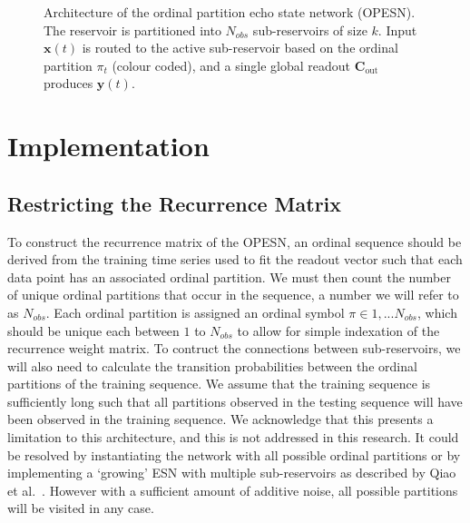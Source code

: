 \begin{figure}
    \caption{Architecture of the ordinal partition echo state network (OPESN). The reservoir is partitioned into $N_{obs}$ sub-reservoirs of size $k$. Input $\mathbf{x}(t)$ is routed to the active sub-reservoir based on the ordinal partition $\pi_t$ (colour coded), and a single global readout $\mathbf{C}_{\text{out}}$ produces $\mathbf{y}(t)$.}
    \label{fig:OPESN}
\end{figure}

\section{Implementation}

\subsection{Restricting the Recurrence Matrix}

To construct the recurrence matrix of the OPESN, an ordinal sequence should be derived from the training time series used to fit the readout vector such that each data point has an associated ordinal partition. We must then count the number of unique ordinal partitions that occur in the sequence, a number we will refer to as $N_{obs}$. Each ordinal partition is assigned an ordinal symbol $\pi \in 1,...N_{obs}$, which should be unique each between $1$ to $N_{obs}$ to allow for simple indexation of the recurrence weight matrix. To contruct the connections between sub-reservoirs, we will also need to calculate the transition probabilities between the ordinal partitions of the training sequence. We assume that the training sequence is sufficiently long such that all partitions observed in the testing sequence will have been observed in the training sequence. We acknowledge that this presents a limitation to this architecture, and this is not addressed in this research. It could be resolved by instantiating the network with all possible ordinal partitions or by implementing a `growing' ESN with multiple sub-reservoirs as described by Qiao et al.~\cite{qiao_2016}. However with a sufficient amount of additive noise, all possible partitions will be visited in any case.

